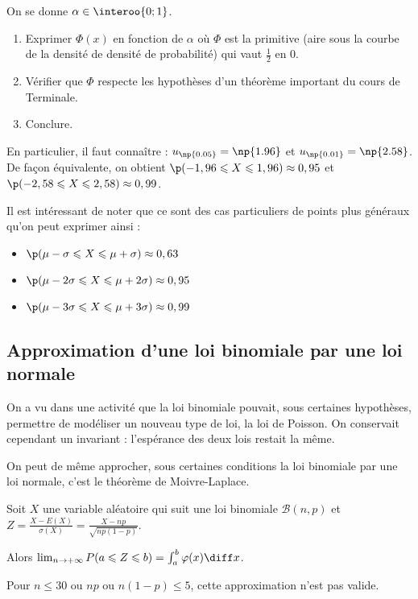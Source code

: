 \documentclass[11pt,a4paper,french]{article}
\begin{document}
\begin{exercice}
  On se donne $\alpha \in \interoo{0;1}$.
  \begin{enumerate}
    \item Exprimer $\Phi(x)$ en fonction de $\alpha$ où $\Phi$ est la
      primitive (aire sous la courbe de la densité de densité de
      probabilité) qui vaut $\frac12$ en 0.
    \item Vérifier que $\Phi$ respecte les hypothèses d'un théorème
      important du cours de Terminale.
    \item Conclure.
  \end{enumerate}
\end{exercice}

En particulier, il faut connaître : $u_{\np{0.05}} = \np{1.96}$ et
$u_{\np{0.01}} = \np{2.58}$. De façon équivalente, on obtient $\p(-1,96
\leqslant X \leqslant 1,96) \approx 0,95$ et $\p(-2,58 \leqslant X
\leqslant 2,58) \approx 0,99$.

Il est intéressant de noter que ce sont des cas particuliers de points
plus généraux qu'on peut exprimer ainsi :
\begin{itemize}
  \item $\p(\mu - \sigma \leqslant X \leqslant \mu + \sigma) \approx
    0,63$
  \item $\p(\mu - 2\sigma \leqslant X \leqslant \mu + 2\sigma) \approx
    0,95$
  \item $\p(\mu - 3\sigma \leqslant X \leqslant \mu + 3\sigma) \approx
    0,99$
\end{itemize}

\pagebreak

\subsection{Approximation d'une loi binomiale par une loi normale}

On a vu dans une activité que la loi binomiale pouvait, sous certaines
hypothèses, permettre de modéliser un nouveau type de loi, la loi de
Poisson. On conservait cependant un invariant : l'espérance des deux
lois restait la même.

On peut de même approcher, sous certaines conditions la loi binomiale
par une loi normale, c'est le théorème de Moivre-Laplace.

\begin{theoreme}[Admis]
  Soit $X$ une variable aléatoire qui suit une loi binomiale
  $\mathcal{B}(n,p)$ et $Z = \frac{X - E(X)}{\sigma(X)} = \frac{X -
  np}{\sqrt{np(1-p)}}$.

  Alors $\lim_{n\to+\infty} P(a \leqslant Z \leqslant b) = \int_a^b
  \varphi(x) \diff x$.
\end{theoreme}

\begin{remarque}
  Pour $n \leqslant 30$ ou $np$ ou $n(1-p) \leqslant 5$, cette
  approximation n'est pas valide.
\end{remarque}
\end{document}

